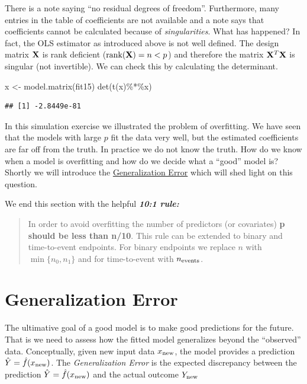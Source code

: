 \documentclass[
]{book}
\newenvironment{Shaded}{\begin{snugshade}}{\end{snugshade}}
\newcommand{\FunctionTok}[1]{\textcolor[rgb]{0.00,0.00,0.00}{#1}}
\newcommand{\NormalTok}[1]{#1}
\newcommand{\OtherTok}[1]{\textcolor[rgb]{0.56,0.35,0.01}{#1}}
\newcommand{\SpecialCharTok}[1]{\textcolor[rgb]{0.00,0.00,0.00}{#1}}
\begin{document}
There is a note saying ``no residual degrees of freedom''. Furthermore, many entries in the table of coefficients are not available and a note says that coefficients cannot be calculated because of \emph{singularities}. What has happened? In fact, the OLS estimator as introduced above is not well defined. The design matrix \(\bf X\) is rank deficient (\({\rm rank}({\bf X})=n< p\)) and therefore the matrix \({\bf X}^T {\bf X}\) is singular (not invertible). We can check this by calculating the determinant.

\begin{Shaded}
\begin{Highlighting}[]
\NormalTok{x }\OtherTok{\textless{}{-}} \FunctionTok{model.matrix}\NormalTok{(fit15)}
\FunctionTok{det}\NormalTok{(}\FunctionTok{t}\NormalTok{(x)}\SpecialCharTok{\%*\%}\NormalTok{x)}
\end{Highlighting}
\end{Shaded}

\begin{verbatim}
## [1] -2.8449e-81
\end{verbatim}

In this simulation exercise we illustrated the problem of overfitting. We have seen that the models with large \(p\) fit the data very well, but the estimated coefficients are far off from the truth. In practice we do not know the truth. How do we know when a model is overfitting and how do we decide what a ``good'' model is? Shortly we will introduce the \protect\hyperlink{generalization-error}{Generalization Error} which will shed light on this question.

We end this section with the helpful \textbf{\emph{10:1 rule:}}

\begin{quote}
In order to avoid overfitting the number of predictors (or covariates) \textbf{p should be less than n/10}. This rule can be extended to binary and time-to-event endpoints. For binary endpoints we replace \(n\) with \(\min\{n_0,n_1\}\) and for time-to-event with \(n_{\rm events}\).
\end{quote}

\hypertarget{generalization-error}{%
\section{Generalization Error}\label{generalization-error}}

The ultimative goal of a good model is to make good predictions for the future. That is we need to assess how the fitted model generalizes beyond the ``observed'' data. Conceptually, given new input data \(x_{\rm new}\), the model provides a prediction \(\hat{Y}=\hat{f}(x_{\rm new})\). The \emph{Generalization Error} is the expected discrepancy between the prediction \(\hat{Y}=\hat{f}(x_{\rm new})\) and the actual outcome \(Y_{\rm new}\)
\end{document}
